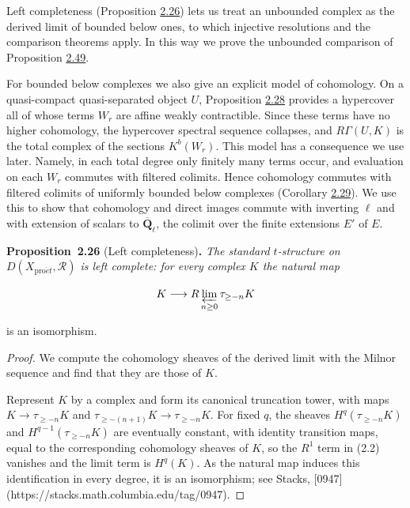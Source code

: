 \documentclass[11pt]{article}
\newenvironment{bpstatement}[2]{\par\addvspace{0.6\baselineskip}\noindent\textbf{#1}#2\textbf{.}\enspace\ignorespaces}
  {\par\addvspace{0.4\baselineskip}}
\newenvironment{bpstatementit}[2]{\begin{bpstatement}{#1}{#2}\itshape\ignorespaces}{\end{bpstatement}}
\begin{document}
Left completeness (Proposition \hyperref[bp75]{2.26}) lets us treat an unbounded complex as the derived limit of bounded below ones, to which injective resolutions and the comparison theorems apply. In this way we prove the unbounded comparison of Proposition \hyperref[bp144]{2.49}.

For bounded below complexes we also give an explicit model of cohomology. On a quasi-compact quasi-separated object \(U\), Proposition \hyperref[bp81]{2.28} provides a hypercover all of whose terms \(W_r\) are affine weakly contractible. Since these terms have no higher cohomology, the hypercover spectral sequence collapses, and \(R\Gamma(U,K)\) is the total complex of the sections \(K^b(W_r)\). This model has a consequence we use later. Namely, in each total degree only finitely many terms occur, and evaluation on each \(W_r\) commutes with filtered colimits. Hence cohomology commutes with filtered colimits of uniformly bounded below complexes (Corollary \hyperref[bp84]{2.29}). We use this to show that cohomology and direct images commute with inverting \(\ell\) and with extension of scalars to \(\overline{\mathbf Q}_\ell\), the colimit over the finite extensions \(E'\) of \(E\).

\label{bp75}%
\begin{bpstatementit}{Proposition~2.26}{ (Left completeness)}
The standard \(t\)-structure on \(D(X_{\mathrm{pro}\acute{e}t},\mathcal R)\) is left complete: for every complex \(K\) the natural map

\[
K\longrightarrow R\varprojlim_{n\geq0}\tau_{\geq-n}K
\]

is an isomorphism.
\end{bpstatementit}

\begin{proof}[{Proof}]\label{bp76}%
We compute the cohomology sheaves of the derived limit with the Milnor sequence and find that they are those of \(K\).

Represent \(K\) by a complex and form its canonical truncation tower, with maps \(K\to\tau_{\geq-n}K\) and \(\tau_{\geq-(n+1)}K\to\tau_{\geq-n}K\). For fixed \(q\), the sheaves \(H^q(\tau_{\geq-n}K)\) and \(H^{q-1}(\tau_{\geq-n}K)\) are eventually constant, with identity transition maps, equal to the corresponding cohomology sheaves of \(K\), so the \(R^1\) term in (2.2) vanishes and the limit term is \(H^q(K)\). As the natural map induces this identification in every degree, it is an isomorphism; see Stacks, [0947](https://stacks.math.columbia.edu/tag/0947).
\end{proof}
\end{document}
